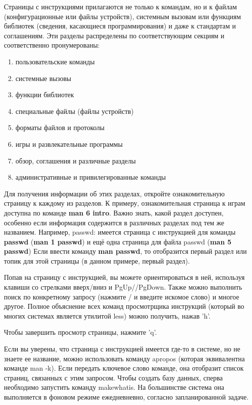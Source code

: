 \documentclass[10pt]{book}
\begin{document}
Страницы с инструкциями прилагаются не только к командам, но и к файлам (конфигурационные или файлы устройств), системным вызовам или функциям библиотек (сведения, касающиеся программирования) и даже к стандартам и соглашениям. Эти разделы распределены по соответствующим секциям и соответственно пронумерованы:

\begin{enumerate}
	\item пользовательские команды
	\item системные вызовы
	\item функции библиотек
	\item специальные файлы (файлы устройств)
	\item форматы файлов и протоколы
	\item игры и развлекательные программы
	\item обзор, соглашения и различные разделы
	\item административные и привилегированные команды
\end{enumerate}

Для получения информации об этих разделах, откройте ознакомительную страницу к каждому из разделов. К примеру, ознакомительная страница к играм доступна по команде \textbf{man 6 intro}. Важно знать, какой раздел доступен, особенно если информация содержится в различных разделах под тем же названием. Например, passwd: имеется страница с инструкцией для команды \textbf{passwd} (\textbf{man 1 passwd}) и ещё одна страница для файла passwd (\textbf{man 5 passwd}) Если ввести команду \textbf{man passwd}, то отобразится первый раздел или топик для этой страницы (в данном примере, первый раздел).

Попав на страницу с инструкцией, вы можете ориентироваться в ней, используя клавиши со стрелками вверх/вниз  и PgUp//PgDown. Также можно выполнить поиск по конкретному запросу (нажмите / и введите искомое слово) и многое другое. Полное объяснение всех команд просмотрщика инструкций (который во многих системах является утилитой less) можно получить, нажав 'h'.

Чтобы завершить просмотр страницы, нажмите 'q'.

Если вы уверены, что страница с инструкцией имеется где-то в системе, но не знаете ее название, можно использовать команду apropos (которая эквивалентна команде man -k). Если передать ключевое слово команде, она отобразит список страниц, связанных с этим запросом. Чтобы создать базу данных, сперва необходимо запустить команду makewhatis. На большинстве система она выполняется в фоновом режиме ежедневневно, согласно запланированной задаче.  
\end{document}

